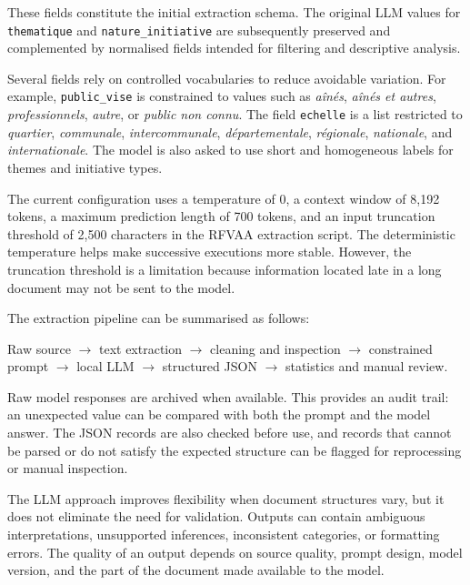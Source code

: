 \documentclass[
11pt,
english,
singlespacing,
headsepline,
]{MastersDoctoralThesis}
\begin{document}
These fields constitute the initial extraction schema. The original LLM values
for \texttt{thematique} and \texttt{nature\_initiative} are subsequently
preserved and complemented by normalised fields intended for filtering and
descriptive analysis.

Several fields rely on controlled vocabularies to reduce avoidable variation.
For example, \texttt{public\_vise} is constrained to values such as
\textit{aînés}, \textit{aînés et autres}, \textit{professionnels},
\textit{autre}, or \textit{public non connu}. The field \texttt{echelle} is a
list restricted to \textit{quartier}, \textit{communale},
\textit{intercommunale}, \textit{départementale}, \textit{régionale},
\textit{nationale}, and \textit{internationale}. The model is also asked to use
short and homogeneous labels for themes and initiative types.

The current configuration uses a temperature of 0, a context window of 8,192
tokens, a maximum prediction length of 700 tokens, and an input truncation
threshold of 2,500 characters in the RFVAA extraction script. The deterministic
temperature helps make successive executions more stable. However, the
truncation threshold is a limitation because information located late in a long
document may not be sent to the model.

The extraction pipeline can be summarised as follows:

\begin{center}
Raw source $\rightarrow$ text extraction $\rightarrow$ cleaning and inspection
$\rightarrow$ constrained prompt $\rightarrow$ local LLM $\rightarrow$
structured JSON $\rightarrow$ statistics and manual review.
\end{center}

Raw model responses are archived when available. This provides an audit trail:
an unexpected value can be compared with both the prompt and the model answer.
The JSON records are also checked before use, and records that cannot be parsed
or do not satisfy the expected structure can be flagged for reprocessing or
manual inspection.

The LLM approach improves flexibility when document structures vary, but it
does not eliminate the need for validation. Outputs can contain ambiguous
interpretations, unsupported inferences, inconsistent categories, or formatting
errors. The quality of an output depends on source quality, prompt design, model
version, and the part of the document made available to the model.
\end{document}
